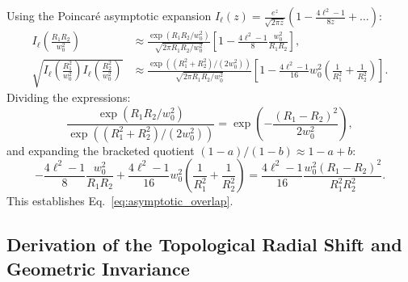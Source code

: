 \documentclass[11pt,a4paper]{article}
\begin{document}
Using the Poincaré asymptotic expansion $I_\ell(z) = \frac{e^z}{\sqrt{2\pi z}} (1 - \frac{4\ell^2 - 1}{8z} + \dots)$:
\begin{align}
I_\ell\left( \frac{R_1 R_2}{w_0^2} \right) &\approx \frac{\exp(R_1 R_2 / w_0^2)}{\sqrt{2\pi R_1 R_2 / w_0^2}} \left[ 1 - \frac{4\ell^2 - 1}{8} \frac{w_0^2}{R_1 R_2} \right], \\
\sqrt{I_\ell\left( \frac{R_1^2}{w_0^2} \right) I_\ell\left( \frac{R_2^2}{w_0^2} \right)} &\approx \frac{\exp((R_1^2 + R_2^2) / (2 w_0^2))}{\sqrt{2\pi R_1 R_2 / w_0^2}} \left[ 1 - \frac{4\ell^2 - 1}{16} w_0^2 \left( \frac{1}{R_1^2} + \frac{1}{R_2^2} \right) \right].
\end{align}
Dividing the expressions:
\begin{equation}
\frac{\exp(R_1 R_2 / w_0^2)}{\exp((R_1^2 + R_2^2) / (2 w_0^2))} = \exp\left( - \frac{(R_1 - R_2)^2}{2 w_0^2} \right),
\end{equation}
and expanding the bracketed quotient $(1 - a)/(1 - b) \approx 1 - a + b$:
\begin{equation}
- \frac{4\ell^2 - 1}{8} \frac{w_0^2}{R_1 R_2} + \frac{4\ell^2 - 1}{16} w_0^2 \left( \frac{1}{R_1^2} + \frac{1}{R_2^2} \right) = \frac{4\ell^2 - 1}{16} \frac{w_0^2 (R_1 - R_2)^2}{R_1^2 R_2^2}.
\end{equation}
This establishes Eq.~\eqref{eq:asymptotic_overlap}.

\subsection{Derivation of the Topological Radial Shift and Geometric Invariance}
\end{document}

